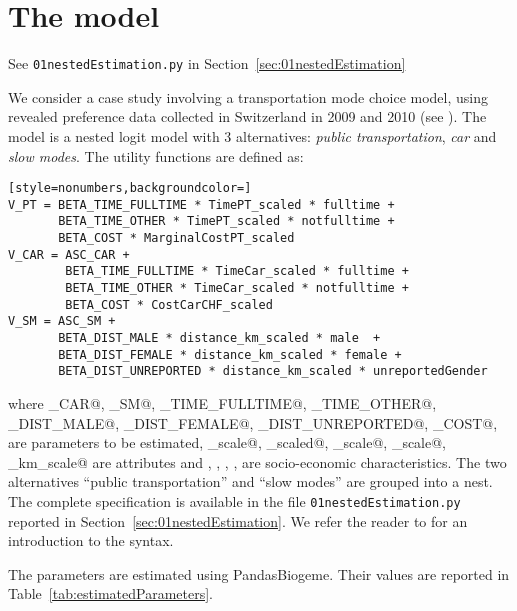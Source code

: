 \documentclass[12pt,a4paper]{article}
\begin{document}
\section{The model}

\begin{flushright}
See \lstinline$01nestedEstimation.py$ in Section~\ref{sec:01nestedEstimation}
\end{flushright}

We consider a case study involving a transportation mode choice model,
using revealed preference data collected in Switzerland in 2009 and
2010 (see \cite{AtaGlerBier2012_DISP}).
The model is a nested logit model with 3 alternatives: \emph{public
  transportation}, \emph{car} and \emph{slow modes}. The utility functions are defined as:
\begin{lstlisting}[style=nonumbers,backgroundcolor=]
V_PT = BETA_TIME_FULLTIME * TimePT_scaled * fulltime +
       BETA_TIME_OTHER * TimePT_scaled * notfulltime +
       BETA_COST * MarginalCostPT_scaled
V_CAR = ASC_CAR +
        BETA_TIME_FULLTIME * TimeCar_scaled * fulltime +
        BETA_TIME_OTHER * TimeCar_scaled * notfulltime +
        BETA_COST * CostCarCHF_scaled
V_SM = ASC_SM +
       BETA_DIST_MALE * distance_km_scaled * male  +
       BETA_DIST_FEMALE * distance_km_scaled * female +
       BETA_DIST_UNREPORTED * distance_km_scaled * unreportedGender
\end{lstlisting}
where
\lstinline@ASC_CAR@, 
\lstinline@ASC_SM@, 
\lstinline@BETA_TIME_FULLTIME@, 
\lstinline@BETA_TIME_OTHER@, 
\lstinline@BETA_DIST_MALE@, 
\lstinline@BETA_DIST_FEMALE@, 
\lstinline@BETA_DIST_UNREPORTED@, 
\lstinline@BETA_COST@, 
are parameters to be estimated,  
\lstinline@TimePT_scale@,  
\lstinline@MarginalCostPT_scaled@,  
\lstinline@TimeCar_scale@, 
\lstinline@CostCarCHF_scale@, 
\lstinline@distance_km_scale@
are attributes and
\lstinline@fulltime@, 
\lstinline@notfulltime@,  
\lstinline@male@, 
\lstinline@female@, 
\lstinline@unreportedGender@ are socio-economic characteristics.
The two alternatives ``public transportation'' and ``slow modes'' are
grouped into a nest. 
The complete specification is available in the file
\lstinline$01nestedEstimation.py$ reported in
Section~\ref{sec:01nestedEstimation}. We refer the reader to
 for an introduction to the syntax. 

The parameters are estimated using PandasBiogeme. Their values are
reported in Table~\ref{tab:estimatedParameters}. 
\end{document}
